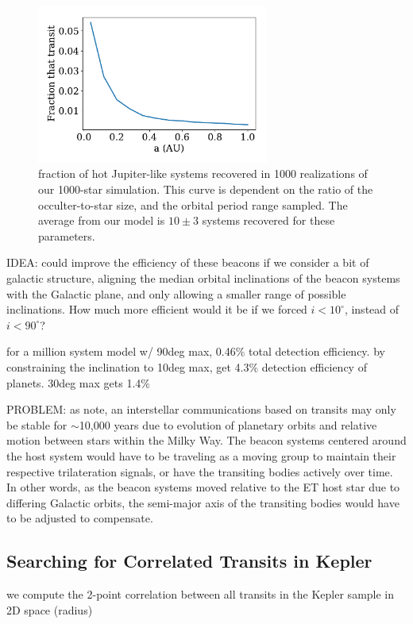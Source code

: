 \documentclass[twocolumn]{aastex62}
\begin{document}
\begin{figure}[]
\centering
\includegraphics[width=3in]{../figures/recov_fraction.pdf}
\caption{fraction of hot Jupiter-like systems recovered in 1000 realizations of our 1000-star simulation. This curve is dependent on the ratio of the occulter-to-star size, and the orbital period range sampled.
The average from our model is $10\pm 3$ systems recovered for these parameters.}
\label{fig:recov}
\end{figure}


IDEA:
could improve the efficiency of these beacons if we consider a bit of galactic structure, aligning the median orbital inclinations of the beacon systems with the Galactic plane, and only allowing a smaller range of possible inclinations. How much more efficient would it be if we forced $i<10^\circ$, instead of $i<90^\circ$?

for a million system model w/ 90deg max, 0.46\% total detection efficiency. 
by constraining the inclination to 10deg max, get 4.3\% detection efficiency of planets. 30deg max gets 1.4\%


PROBLEM:
as \citet{forgan2017} note, an interstellar communications based on transits may only be stable for $\sim$10,000 years due to evolution of planetary orbits and relative motion between stars within the Milky Way. The beacon systems centered around the host system would have to be traveling as a moving group to maintain their respective trilateration signals, or have the transiting bodies actively over time. In other words, as the beacon systems moved relative to the ET host star due to differing Galactic orbits, the semi-major axis of the transiting bodies would have to be adjusted to compensate.



\subsection{Searching for Correlated Transits in Kepler}
we compute the 2-point correlation between all transits in the Kepler sample in 2D space (radius)
\end{document}
